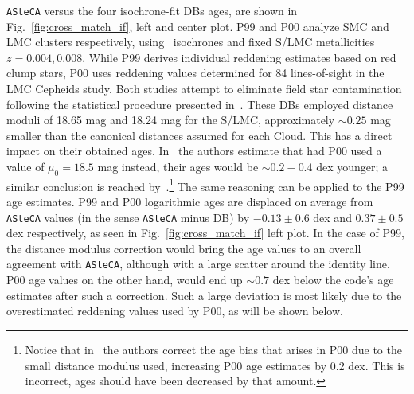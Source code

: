 \documentclass[referee]{aa}
\begin{document}
%
%
\texttt{ASteCA} versus the four isochrone-fit DBs ages, are shown in
Fig.~\ref{fig:cross_match_if}, left and center plot.
%
P99 and P00 analyze SMC and LMC clusters respectively,
using~\cite{Bertelli_1994} isochrones and fixed S/LMC metallicities
$z{=}0.004, 0.008$. While P99 derives individual reddening estimates based on
red clump stars, P00 uses reddening values determined for 84 lines-of-sight
in the~\cite{Udalski_1999} LMC Cepheids study.
%
Both studies attempt to eliminate field star contamination following the
statistical procedure presented in~\cite{Mateo_1986}.
These DBs employed distance moduli of 18.65 mag and 18.24 mag for the S/LMC,
approximately ${\sim}0.25$ mag smaller than the canonical distances assumed for
each Cloud. This has a direct impact on their obtained ages.
%
In~\cite{de_Grijs_2006} the authors estimate that had P00 used a value
of $\mu_0{=}18.5$ mag instead, their ages would be ${\sim}0.2{-}0.4$
dex younger; a similar conclusion is reached by~\cite{Baumgardt_2013}.\footnote
{Notice that in~\cite{Baumgardt_2013} the authors correct the age bias that
arises in P00 due to the small distance modulus used, increasing P00 age
estimates by 0.2 dex. This is incorrect, ages should have been decreased by that
amount.} The same reasoning can be applied to the P99 age estimates.
%
P99 and P00 logarithmic ages are displaced on average from \texttt{ASteCA}
values (in the sense \texttt{ASteCA} minus DB) by $-0.13{\pm}0.6$ dex and $0.37
{\pm}0.5$ dex respectively, as seen in Fig.~\ref{fig:cross_match_if} left plot.
In the case of P99, the distance modulus correction would bring the age values
to an overall agreement with \texttt{ASteCA}, although with a large scatter
around the identity line.
%
P00 age values on the other hand, would end up ${\sim}0.7$ dex below the code's
age estimates after such a correction. Such a large deviation is most likely due
to the overestimated reddening values used by P00, as will be shown below.
\end{document}
